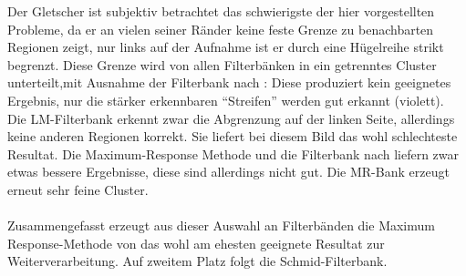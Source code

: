 Der Gletscher ist subjektiv betrachtet das schwierigste der hier vorgestellten Probleme, da er an vielen seiner Ränder keine feste Grenze zu benachbarten Regionen zeigt, nur links auf der Aufnahme ist er durch eine Hügelreihe strikt begrenzt. Diese Grenze wird von allen Filterbänken in ein getrenntes Cluster unterteilt,mit Ausnahme der Filterbank nach \cite{jain_91}: Diese produziert kein geeignetes Ergebnis, nur die stärker erkennbaren \enquote{Streifen} werden gut erkannt (violett). Die LM-Filterbank erkennt zwar die Abgrenzung auf der linken Seite, allerdings keine anderen Regionen korrekt. Sie liefert bei diesem Bild das wohl schlechteste Resultat. Die Maximum-Response Methode und die Filterbank nach \cite{schmid_01} liefern zwar etwas bessere Ergebnisse, diese sind allerdings nicht gut. Die MR-Bank erzeugt erneut sehr feine Cluster.

\paragraph{}
Zusammengefasst erzeugt aus dieser Auswahl an Filterbänden die Maximum Response-Methode von \cite{visgeo} das wohl am ehesten geeignete Resultat zur Weiterverarbeitung. Auf zweitem Platz folgt die Schmid-Filterbank.

